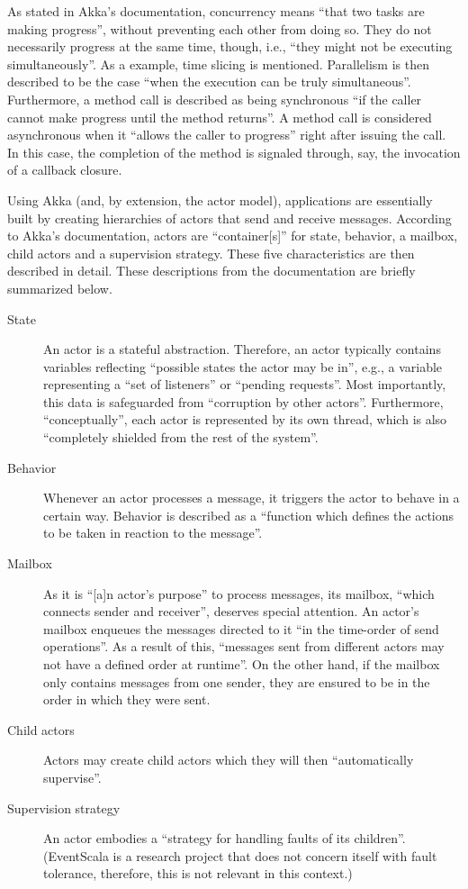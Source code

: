 \documentclass[article, 10pt, type=bsc, colorback, accentcolor=tud8b, parskip=half, bibliography=totocnumbered]{tudthesis}
\begin{document}
As stated in Akka's documentation, concurrency means ``that two tasks are making progress'', without preventing each other from doing so.
They do not necessarily progress at the same time, though, i.e., ``they might not be executing simultaneously''.
As a example, time slicing is mentioned.
Parallelism is then described to be the case ``when the execution can be truly simultaneous''.
Furthermore, a method call is described as being synchronous ``if the caller cannot make progress until the method returns''.
A method call is considered asynchronous when it ``allows the caller to progress'' right after issuing the call.
In this case, the completion of the method is signaled through, say, the invocation of a callback closure.

Using Akka (and, by extension, the actor model), applications are essentially built by creating hierarchies of actors that send and receive messages.
According to Akka's documentation, actors are ``container[s]'' for state, behavior, a mailbox, child actors and a supervision strategy.
These five characteristics are then described in detail.
These descriptions from the documentation \cite{akkadoc} are briefly summarized below.

\begin{description}
\item[State]
An actor is a stateful abstraction.
Therefore, an actor typically contains variables reflecting ``possible states the actor may be in'', e.g., a variable representing a ``set of listeners'' or ``pending requests''.
Most importantly, this data is safeguarded from ``corruption by other actors''.
Furthermore, ``conceptually'', each actor is represented by its own thread, which is also ``completely shielded from the rest of the system''.
\item[Behavior]
Whenever an actor processes a message, it triggers the actor to behave in a certain way.
Behavior is described as a ``function which defines the actions to be taken in reaction to the message''.
\item[Mailbox]
As it is ``[a]n actor's purpose'' to process messages, its mailbox, ``which connects sender and receiver'', deserves special attention.
An actor's mailbox enqueues the messages directed to it ``in the time-order of send operations''.
As a result of this, ``messages sent from different actors may not have a defined order at runtime''.
On the other hand, if the mailbox only contains messages from one sender, they are ensured to be in the order in which they were sent.
\item[Child actors]
Actors may create child actors which they will then ``automatically supervise''.
\item[Supervision strategy]
An actor embodies a ``strategy for handling faults of its children''.
(EventScala is a research project that does not concern itself with fault tolerance, therefore, this is not relevant in this context.)
\end{description}
\end{document}
